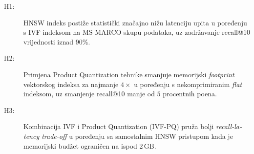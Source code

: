 \begin{description}
    \item[H1:] HNSW indeks postiže statistički značajno nižu latenciju
    upita u poređenju s IVF indeksom na \foreignlanguage{english}{MS MARCO}
    skupu podataka, uz zadržavanje \foreignlanguage{english}{recall@10}
    vrijednosti iznad $90\%$.

    \item[H2:] Primjena \foreignlanguage{english}{Product Quantization}
    tehnike smanjuje memorijski
    \foreignlanguage{english}{\emph{footprint}} vektorskog indeksa za
    najmanje $4\times$ u poređenju s nekomprimiranim
    \foreignlanguage{english}{\emph{flat}} indeksom, uz smanjenje
    \foreignlanguage{english}{recall@10} manje od $5$ procentnih poena.

    \item[H3:] Kombinacija IVF i \foreignlanguage{english}{Product
    Quantization} (IVF-PQ) pruža bolji
    \foreignlanguage{english}{\emph{recall-latency trade-off}} u poređenju
    sa samostalnim HNSW pristupom kada je memorijski budžet ograničen
    na ispod $2$\,GB.
\end{description}
